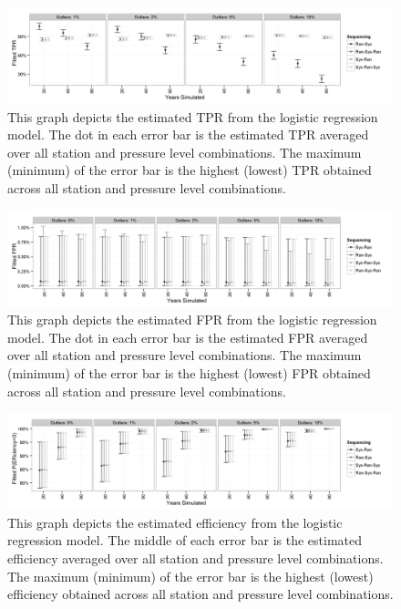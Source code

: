 \documentclass[12pt]{article}
\begin{document}
\begin{figure}[h!]
	\centering
	\includegraphics[width=\textwidth]{TPR_Order_Plot_BW}
	\caption{This graph depicts the estimated TPR from the logistic regression model.  The dot in each error bar is the estimated TPR averaged over all station and pressure level combinations.  The maximum (minimum) of the error bar is the highest (lowest) TPR obtained across all station and pressure level combinations.}
	\label{fig:fitTPR}
\end{figure}

\begin{figure}[h!]
	\centering
	\includegraphics[width=\textwidth]{FPR_Order_Plot_BW}
	\caption{This graph depicts the estimated FPR from the logistic regression model.  The dot in each error bar is the estimated FPR averaged over all station and pressure level combinations.  The maximum (minimum) of the error bar is the highest (lowest) FPR obtained across all station and pressure level combinations.  }
	\label{fig:fitFPR}
\end{figure}


\begin{figure}[h!]
	\centering
	\includegraphics[width=\textwidth]{Efficiency_Order_Plot_BW}
	\caption{This graph depicts the estimated efficiency from the logistic regression model.  The middle of each error bar is the estimated efficiency averaged over all station and pressure level combinations.  The maximum (minimum) of the error bar is the highest (lowest) efficiency obtained across all station and pressure level combinations.}
	\label{fig:fitEffOrd}
\end{figure}
\end{document}

